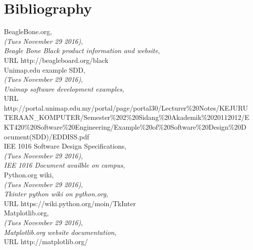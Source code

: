 \documentclass[10pt,draftclsnofoot,onecolumn,retainorgcmds]{IEEEtran}
\begin{document}
\newpage

\section{Bibliography}
\begin{thebibliography}{9}
	
	BeagleBone.org,\\
	\emph{(Tues November 29 2016)},\\
	\emph{Beagle Bone Black product information and website},\\
	URL  http://beagleboard.org/black \\
	
	Unimap.edu example SDD,\\
	\emph{(Tues November 29 2016)}, \\
	\emph{Unimap software development examples}, \\
	URL http://portal.unimap.edu.my/portal/page/portal30/Lecturer\%20Notes/KEJURUTERAAN\_KOMPUTER/Semester\%202\%20Sidang\%20Akademik\%2020112012/EKT420\%20Software\%20Engineering/Example\%20of\%20Software\%20Design\%20Document(SDD)/EDDISS.pdf \\
	
	IEE 1016 Software Design Specifications,\\
	\emph{(Tues November 29 2016)}, \\
	\emph{IEE 1016 Document availble on campus}, \\
	
	Python.org wiki,\\
	\emph{(Tues November 29 2016)}, \\
	\emph{Tkinter python wiki on python.org}, \\
	URL https://wiki.python.org/moin/TkInter\\
	
	Matplotlib.org,\\
	\emph{(Tues November 29 2016)}, \\
	\emph{Matplotlib.org website documentation}, \\
	URL http://matplotlib.org/
	
\end{thebibliography}
\end{document}
